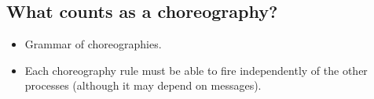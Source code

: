 \subsection{What counts as a choreography?}\label{sec:what-counts-choreo}

\begin{itemize}
\item Grammar of choreographies.
\item Each choreography rule must be able to fire independently of the other processes (although it may depend on messages).
\end{itemize}

